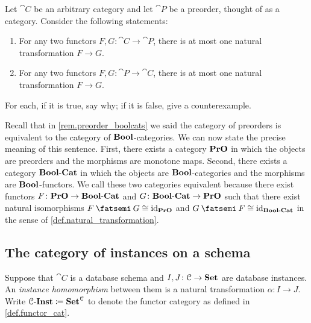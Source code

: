 \documentclass[7Sketches]{subfiles}
\begin{document}
\begin{exercise}%
\label{exc.true_false_preorder_nt}
Let $\cat{C}$ be an arbitrary category and let $\cat{P}$ be a preorder, thought of as a category. Consider the following statements:
\begin{enumerate}
	\item For any two functors $F,G\colon\cat{C}\to\cat{P}$, there is at most one natural transformation $F\to G$.
	\item For any two functors $F,G\colon\cat{P}\to\cat{C}$, there is at most one natural transformation $F\to G$.
\end{enumerate}
For each, if it is true, say why; if it is false, give a counterexample.
\end{exercise}

\begin{remark} %
\label{rem.preorder_boolcats2}%
Recall that in \cref{rem.preorder_boolcats} we said the category of preorders is
equivalent to the category of $\mathbf{Bool}$-categories. We can now state the precise meaning
of this sentence. First, there exists a category $\mathbf{PrO}$ in which the
objects are preorders and the morphisms are monotone maps. Second, there exists a
category $\mathbf{Bool}\textrm{-}\mathbf{Cat}$ in which the objects are $\mathbf{Bool}$-categories and the
morphisms are $\mathbf{Bool}$-functors. We call these two categories equivalent because
there exist functors $F\colon \mathbf{PrO} \to \mathbf{Bool}\textrm{-}\mathbf{Cat}$ and $G\colon
\mathbf{Bool}\textrm{-}\mathbf{Cat} \to \mathbf{PrO}$ such that there exist natural isomorphisms $F\cp G
\cong \id_{\Cat{PrO}}$ and $G\cp F \cong \id_{\Bool\textrm{-}\Cat{Cat}}$ in the sense of \cref{def.natural_transformation}.
\end{remark}


%

\subsection{The category of instances on a schema} %
\label{subsec.instances_cat}%
%

\begin{definition}%
\label{def.instance}%
Suppose that $\cat{C}$ is a database schema and $I,J\colon\mathcal{C}\to\mathbf{Set}$ are database instances. An \emph{instance homomorphism} between them is a natural transformation $\alpha\colon I\to J$. Write $\mathcal{C}\textnormal{-}\mathbf{Inst}\coloneqq\mathbf{Set}^{\mathcal{C}}$ to denote the functor category as defined in \cref{def.functor_cat}.
\end{definition}
\end{document}
